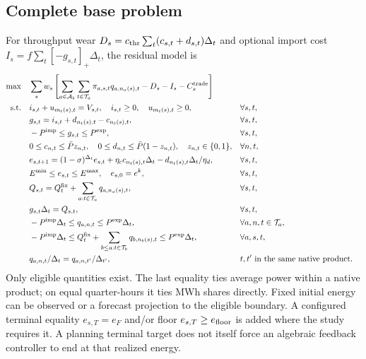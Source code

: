 \documentclass[11pt,a4paper]{article}
\newcommand{\pos}[1]{\left[#1\right]_+}
\begin{document}
\subsection{Complete base problem}
For throughput wear $D_s=c_{\rm thr}\sum_t(c_{s,t}+d_{s,t})\Delta_t$ and
optional import cost $I_s=f\sum_t\pos{-g_{s,t}}\Delta_t$, the residual model is
\begingroup\small
\begin{align}
 \max\quad &\sum_sw_s\left[
    \sum_{a\in\mathcal A_k}\sum_{t\in\mathcal T_a}\pi_{a,s,t}q_{a,n_a(s),t}
       -D_s-I_s-C_s^{\rm trade}\right] \label{eq:short-objective}\\
 \text{s.t.}\quad
 &i_{s,t}+u_{m_t(s),t}=V_{s,t},\quad i_{s,t}\ge0,\quad u_{m_t(s),t}\ge0,
                                                         &&\forall s,t,\\
 &g_{s,t}=i_{s,t}+d_{n_t(s),t}-c_{n_t(s),t},
                                                         &&\forall s,t,\\
 &-P^{\rm imp}\le g_{s,t}\le P^{\rm exp},                  &&\forall s,t,\\
 &0\le c_{n,t}\le\bar Pz_{n,t},\quad
   0\le d_{n,t}\le\bar P(1-z_{n,t}),\quad z_{n,t}\in\{0,1\},&&\forall n,t,\\
 &e_{s,t+1}=(1-\sigma)^{\Delta_t}e_{s,t}
       +\eta_cc_{n_t(s),t}\Delta_t-d_{n_t(s),t}\Delta_t/\eta_d,
                                                         &&\forall s,t,\\
 &E^{\min}\le e_{s,t}\le E^{\max},\quad e_{s,0}=e^k,       &&\forall s,t,\\
 &Q_{s,t}=Q_t^{\rm fix}+\sum_{a:t\in\mathcal T_a}q_{a,n_a(s),t},
                                                         &&\forall s,t,\\
 &g_{s,t}\Delta_t=Q_{s,t},                                &&\forall s,t,\\
 &-P^{\rm imp}\Delta_t\le q_{a,n,t}\le P^{\rm exp}\Delta_t,&&\forall a,n,t\in\mathcal T_a,\\
 &-P^{\rm imp}\Delta_t\le Q_t^{\rm fix}
           +\sum_{b\le a:t\in\mathcal T_b}q_{b,n_b(s),t}
            \le P^{\rm exp}\Delta_t,                     &&\forall a,s,t,\\
 &q_{a,n,t}/\Delta_t=q_{a,n,t'}/\Delta_{t'},
                  &&t,t'\text{ in the same native product}.\label{eq:short-product}
\end{align}
\endgroup
Only eligible quantities exist. The last equality ties average power within a
native product; on equal quarter-hours it ties MWh shares directly. Fixed
initial energy can be observed or a forecast projection to the eligible
boundary. A configured terminal equality $e_{s,T}=e_F$ and/or floor
$e_{s,T}\ge e_{\rm floor}$ is added where the study requires it. A planning
terminal target does not itself force an algebraic feedback controller to end
at that realized energy.
\end{document}
